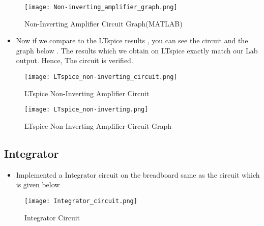 \documentclass[9pt,conference]{IEEEtran}
\begin{document}
\begin{figure}[H]
    \centering
    \texttt{[image: Non-inverting\_amplifier\_graph.png]}
    \caption{Non-Inverting Amplifier Circuit Graph(MATLAB)}
    \label{fig:positive_clamper}
\end{figure}

\begin{itemize}
    \item Now if we compare to the LTspice results , you can see the circuit and the graph below . The results which we obtain on LTspice exactly match our Lab output. Hence, The circuit is verified.
\end{itemize}
\begin{figure}[H]
    \centering
    \texttt{[image: LTspice\_non-inverting\_circuit.png]}
    \caption{LTspice Non-Inverting Amplifier Circuit}
    \label{fig:positive_clamper}
\end{figure}
\begin{figure}[H]
    \centering
    \texttt{[image: LTspice\_non-inverting.png]}
    \caption{LTspice Non-Inverting Amplifier Circuit Graph}
    \label{fig:positive_clamper}
\end{figure}

\subsection{Integrator}
\begin{itemize}
    \item Implemented a Integrator circuit on the breadboard same as the circuit which is given below
\end{itemize}
\begin{figure}[H]
    \centering
    \texttt{[image: Integrator\_circuit.png]}
    \caption{Integrator Circuit}
    \label{fig:clamper_circuit}
\end{figure}
\end{document}

